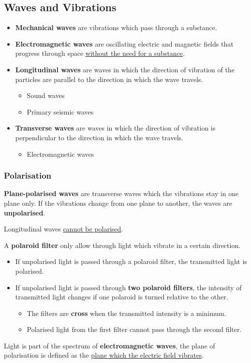 \subsection{Waves and Vibrations}

\begin{itemize}
    \item \textbf{Mechanical waves} are vibrations which pass through a substance.
    \item \textbf{Electromagnetic waves} are oscillating electric and magnetic fields that progress through space \underline{without the need for a substance}.
    \item \textbf{Longitudinal waves} are waves in which the direction of vibration of the particles are parallel to the direction in which the wave travels.
        \begin{itemize}
            \item Sound waves
            \item Primary seismic waves
        \end{itemize}
    \item \textbf{Transverse waves} are waves in which the direction of vibration is perpendicular to the direction in which the wave travels.
        \begin{itemize}
            \item Electromagnetic waves
        \end{itemize}
\end{itemize}

\subsubsection*{Polarisation}

\textbf{Plane-polarised waves} are transverse waves which the vibrations stay in one plane only. If the vibrations change from one plane to another, the waves are \textbf{unpolarised}.

Longitudinal waves \underline{cannot be polarised}.

A \textbf{polaroid filter} only allow through light which vibrate in a certain direction.
\begin{itemize}
    \item If unpolarised light is passed through a polaroid filter, the transmitted light is polarised.
    \item If unpolarised light is passed through \textbf{two polaroid filters}, the intensity of transmitted light changes if one polaroid is turned relative to the other.
        \begin{itemize}
            \item The filters are \textbf{cross} when the transmitted intensity is a minimum.
            \item Polarised light from the first filter cannot pass through the second filter.
        \end{itemize}
\end{itemize}

Light is part of the spectrum of \textbf{electromagnetic waves}, the plane of polarisation is defined as the \underline{plane which the electric field vibrates}.
